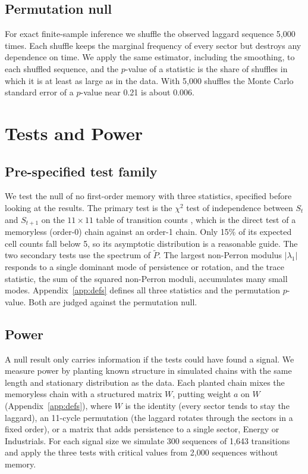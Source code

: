 \documentclass[11pt]{article}
\begin{document}
\subsection{Permutation null}
\label{sec:perm}

For exact finite-sample inference we shuffle the observed laggard sequence 5{,}000 times. Each shuffle keeps the marginal frequency of every sector but destroys any dependence on time. We apply the same estimator, including the smoothing, to each shuffled sequence, and the $p$-value of a statistic is the share of shuffles in which it is at least as large as in the data. With 5{,}000 shuffles the Monte Carlo standard error of a $p$-value near 0.21 is about 0.006.

\clearpage
\section{Tests and Power}
\label{sec:tests}

\subsection{Pre-specified test family}

We test the null of no first-order memory with three statistics, specified before looking at the results. The primary test is the $\chi^2$ test of independence between $S_t$ and $S_{t+1}$ on the $11 \times 11$ table of transition counts \cite{andersongoodman1957}, which is the direct test of a memoryless (order-0) chain against an order-1 chain. Only 15\% of its expected cell counts fall below 5, so its asymptotic distribution is a reasonable guide. The two secondary tests use the spectrum of $\tilde P$. The largest non-Perron modulus $|\lambda_1|$ responds to a single dominant mode of persistence or rotation, and the trace statistic, the sum of the squared non-Perron moduli, accumulates many small modes. Appendix~\ref{app:defs} defines all three statistics and the permutation $p$-value. Both are judged against the permutation null.

\subsection{Power}
\label{sec:power}

A null result only carries information if the tests could have found a signal. We measure power by planting known structure in simulated chains with the same length and stationary distribution as the data. Each planted chain mixes the memoryless chain with a structured matrix $W$, putting weight $a$ on $W$ (Appendix~\ref{app:defs}), where $W$ is the identity (every sector tends to stay the laggard), an 11-cycle permutation (the laggard rotates through the sectors in a fixed order), or a matrix that adds persistence to a single sector, Energy or Industrials. For each signal size we simulate 300 sequences of 1{,}643 transitions and apply the three tests with critical values from 2{,}000 sequences without memory.
\end{document}
